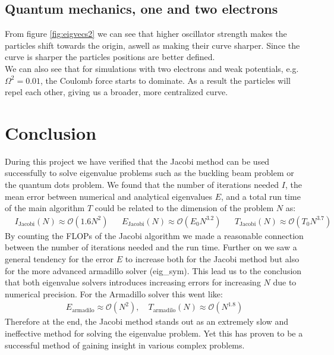 \documentclass[american,a4paper,12pt]{article}
\begin{document}
\subsection{Quantum mechanics, one and two electrons}
From figure \ref{fig:eigvecs2} we can see that higher oscillator strength makes the particles shift towards the origin, aswell as making their curve sharper. Since the curve is sharper the particles positions are better defined.\\
We can also see that for simulations with two electrons and weak potentials, e.g. $\Omega^2=0.01$, the Coulomb force starts to dominate. As a result the particles will repel each other, giving us a broader, more centralized curve.

\section{Conclusion}
During this project we have verified that the Jacobi method can be used successfully to solve eigenvalue problems such as the buckling beam problem or the quantum dots problem. We found that the number of iterations needed $I$, the mean error between numerical and analytical eigenvalues $E$, and a total run time of the main algorithm $T$ could be related to the dimension of the problem $N$ as:
\begin{align*}
    &I_{\text{Jacobi}}(N) \approx \mathcal{O}(1.6N^2)&  &E_{\text{Jacobi}}(N) \approx \mathcal{O}(E_0N^{3.2})&  &T_{\text{Jacobi}}(N) \approx \mathcal{O}(T_0N^{3.7})&
\end{align*}
By counting the FLOPs of the Jacobi algorithm we made a reasonable connection between the number of iterations needed and the run time. Further on we saw a general tendency for the error $E$ to increase both for the Jacobi method but also for the more advanced armadillo solver (eig\_sym). This lead us to the conclusion that both eigenvalue solvers introduces increasing errors for increasing $N$ due to numerical precision. For the Armadillo solver this went like:
\begin{align*}
    E_{\text{armadilo}} \approx \mathcal{O}(N^{2}), \quad T_{\text{armadilo}}(N) \approx \mathcal{O}(N^{1.8})
\end{align*}
Therefore at the end, the Jacobi method stands out as an extremely slow and ineffective method for solving the eigenvalue problem. Yet this has proven to be a successful method of gaining insight in various complex problems.
\end{document}
